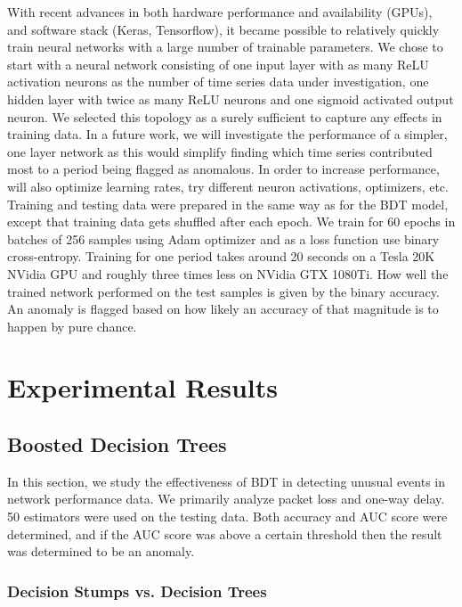 \documentclass[5p]{elsarticle}
\begin{document}
With recent advances in both hardware performance and availability (GPUs), and software stack (Keras, Tensorflow), it became possible to relatively quickly train neural networks with a large number of trainable parameters. We chose to start with a neural network consisting of one input layer with as many ReLU activation neurons as the number of time series data under investigation, one hidden layer with twice as many ReLU neurons and one sigmoid activated output neuron. We selected this topology as a surely sufficient to capture any effects in training data. In a future work, we will investigate the performance of a simpler, one layer network as this would simplify finding which time series contributed most to a period being flagged as anomalous. In order to increase performance, will also optimize learning rates, try different neuron activations, optimizers,  etc.  
Training and testing data were prepared in the same way as for the BDT model, except that training data gets shuffled after each epoch. We train for 60 epochs in batches of 256 samples using Adam optimizer \cite{jedanaest} and as a loss function use binary cross-entropy. Training for one period takes around 20 seconds on a Tesla 20K NVidia GPU and roughly three times less on NVidia GTX 1080Ti. How well the trained network performed on the test samples is given by the binary accuracy. An anomaly is flagged based on how likely an accuracy of that magnitude is to happen by pure chance.

\section{Experimental Results}

\subsection{Boosted Decision Trees}

In this section, we study the effectiveness of BDT in detecting unusual events in network performance data. We primarily analyze packet loss and one-way delay. 50 estimators were used on the testing data. Both accuracy and AUC score were determined, and if the AUC score was above a certain threshold then the result was determined to be an anomaly.

\subsubsection{Decision Stumps vs. Decision Trees}
\end{document}

